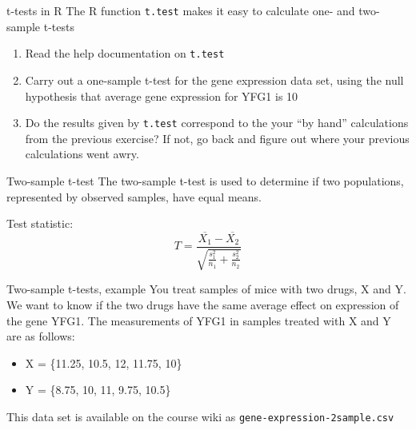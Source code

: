 \documentclass[presentation]{beamer}
\begin{document}
\begin{frame}[fragile,label={sec:org59aafcc}]{t-tests in R}
 The R function \texttt{t.test} makes it easy to calculate one- and two-sample t-tests

\begin{enumerate}
\item Read the help documentation on \texttt{t.test}
\item Carry out a one-sample t-test for the gene expression data set, using the null hypothesis that average gene expression for YFG1 is 10
\item Do the results given by \texttt{t.test} correspond to the your ``by hand'' calculations from the previous exercise?  If not, go back and figure out where your previous calculations went awry.
\end{enumerate}
\end{frame}


\begin{frame}[label={sec:org2412b80}]{Two-sample t-test}
The two-sample t-test is used to determine if two populations, represented by observed samples, have equal means.


Test statistic:
\[
T = \frac{\overline{X_1} - \overline{X_2}}{\sqrt{\frac{s_1^2}{n_1} + \frac{s_2^2}{n_2}}} 
\]
\end{frame}


\begin{frame}[fragile,label={sec:org4707751}]{Two-sample t-tests, example}
 You treat samples of mice with two drugs, X and Y.  We want to know if the two drugs have the same average effect on expression of the gene YFG1. The measurements of YFG1 in samples treated with X and Y are as follows: 


\begin{itemize}
\item X = \{11.25, 10.5, 12, 11.75, 10\}
\item Y = \{8.75, 10, 11, 9.75, 10.5\}
\end{itemize}

This data set is available on the course wiki as \texttt{gene-expression-2sample.csv}
\end{frame}
\end{document}
